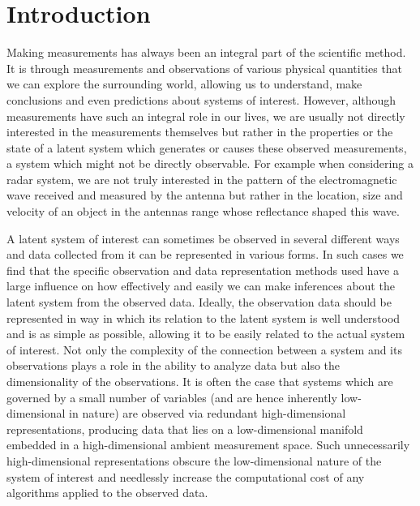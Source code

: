 

\section{Introduction}
	\label{sec:introduction}

	Making measurements has always been an integral part of the scientific method. It is through measurements and observations of various physical quantities that we can explore the surrounding world, allowing us to understand, make conclusions and even predictions about systems of interest. However, although measurements have such an integral role in our lives, we are usually not directly interested in the measurements themselves but rather in the properties or the state of a latent system which generates or causes these observed measurements, a system which might not be directly observable. For example when considering a radar system, we are not truly interested in the pattern of the electromagnetic wave received and measured by the antenna but rather in the location, size and velocity of an object in the antennas range whose reflectance shaped this wave.

	A latent system of interest can sometimes be observed in several different ways and data collected from it can be represented in various forms. In such cases we find that the specific observation and data representation methods used have a large influence on how effectively and easily we can make inferences about the latent system from the observed data. Ideally, the observation data should be represented in way in which its relation to the latent system is well understood and is as simple as possible, allowing it to be easily related to the actual system of interest. Not only the complexity of the connection between a system and its observations plays a role in the ability to analyze data but also the dimensionality of the observations. It is often the case that systems which are governed by a small number of variables (and are hence inherently low-dimensional in nature) are observed via redundant high-dimensional representations, producing data that lies on a low-dimensional manifold embedded in a high-dimensional ambient measurement space. Such unnecessarily high-dimensional representations obscure the low-dimensional nature of the system of interest and needlessly increase the computational cost of any algorithms applied to the observed data.
		

